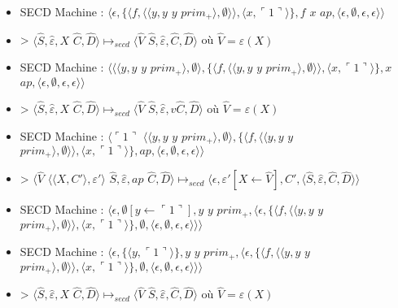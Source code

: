 \documentclass[10pt,a4paper]{article}
\begin{document}
\begin{itemize}
					\item[] SECD Machine : $\langle\epsilon,\{\langle f,\langle\langle y,y$ $y$ $prim_{+}\rangle,\emptyset\rangle\rangle,\langle x,\ulcorner 1\urcorner\rangle\},f$ $x$ $ap,\langle\epsilon,\emptyset,\epsilon,\epsilon\rangle\rangle$
					\item[] > $\langle\widehat{S},\widehat{\varepsilon},X$ $\widehat{C},\widehat{D}\rangle \longmapsto_{secd} \langle \widehat{V}$ $\widehat{S},\widehat{\varepsilon},\widehat{C},\widehat{D}\rangle$ où $\widehat{V} = \varepsilon(X)$
					\item[] SECD Machine : $\langle\langle\langle y,y$ $y$ $prim_{+}\rangle,\emptyset\rangle,\{\langle f,\langle\langle y,y$ $y$ $prim_{+}\rangle,\emptyset\rangle\rangle,\langle x,\ulcorner 1\urcorner\rangle\},x$ $ap,\langle\epsilon,\emptyset,\epsilon,\epsilon\rangle\rangle$
					\item[] > $\langle\widehat{S},\widehat{\varepsilon},X$ $\widehat{C},\widehat{D}\rangle \longmapsto_{secd} \langle \widehat{V}$ $\widehat{S},\widehat{\varepsilon},v
					\widehat{C},\widehat{D}\rangle$ où $\widehat{V} = \varepsilon(X)$
					\item[] SECD Machine : $\langle\ulcorner 1\urcorner$ $\langle\langle y,y$ $y$ $prim_{+}\rangle,\emptyset\rangle,\{\langle f,\langle\langle y,y$ $y$ $prim_{+}\rangle,\emptyset\rangle\rangle,\langle x,\ulcorner 1\urcorner\rangle\},ap,\langle\epsilon,\emptyset,\epsilon,\epsilon\rangle\rangle$
					\item[] >  $\langle\widehat{V}$ $\langle\langle X,C'\rangle,\varepsilon'\rangle$ $\widehat{S},\widehat{\varepsilon},ap$ $\widehat{C},\widehat{D}\rangle \longmapsto_{secd} \langle\epsilon,\varepsilon'[X \leftarrow \widehat{V}],C',\langle\widehat{S},\widehat{\varepsilon},\widehat{C},\widehat{D}\rangle\rangle$
					\item[] SECD Machine :	$\langle\epsilon,\emptyset[y \leftarrow \ulcorner 1\urcorner],y$ $y$ $prim_{+},\langle\epsilon,\{\langle f,\langle\langle y,y$ $y$ $prim_{+}\rangle,\emptyset\rangle\rangle,\langle x,\ulcorner 1\urcorner\rangle\} ,\emptyset,\langle\epsilon,\emptyset,\epsilon,\epsilon\rangle\rangle\rangle$
					\item[] SECD Machine : $\langle\epsilon,\{\langle y,\ulcorner 1\urcorner\rangle\},y$ $y$ $prim_{+},\langle\epsilon,\{\langle f,\langle\langle y,y$ $y$ $prim_{+}\rangle,\emptyset\rangle\rangle,\langle x,\ulcorner 1\urcorner\rangle\} ,\emptyset,\langle\epsilon,\emptyset,\epsilon,\epsilon\rangle\rangle\rangle$
					\item[] > $\langle\widehat{S},\widehat{\varepsilon},X$ $\widehat{C},\widehat{D}\rangle \longmapsto_{secd} \langle \widehat{V}$ $\widehat{S},\widehat{\varepsilon},\widehat{C},\widehat{D}\rangle$ où $\widehat{V} = \varepsilon(X)$

\end{itemize}
\end{document}
